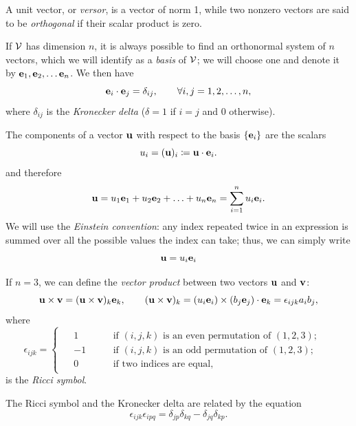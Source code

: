 A unit vector, or \textit{versor}, is a vector of norm 1, while two nonzero vectors are said to be \textit{orthogonal} if their scalar product is zero.

If $\mathcal{V}$ has dimension $n$, it is always possible to find an orthonormal system of $n$ vectors, which we will identify as a \textit{basis} of $\mathcal{V}$; we will choose one and denote it by $\mathbf{e}_1, \mathbf{e}_2, \ldots \mathbf{e}_n$. We then have
\begin{equation}
	\mathbf{e}_i \cdot \mathbf{e}_j=\delta_{ij}, \qquad \forall i,j=1,2,\ldots, n,
\end{equation}
where $\delta_{ij}$ is the \textit{Kronecker delta} ($\delta=1$ if $i=j$ and 0 otherwise).

The components of a vector $\mathbf{u}$ with respect to the basis $\{\mathbf{e}_i\}$ are the scalars
\begin{equation}
	u_i=(\mathbf{u})_i\coloneqq \mathbf{u} \cdot \mathbf{e}_i.
\end{equation}
and therefore
\begin{equation}
	\mathbf{u} =u_1 \mathbf{e}_1+ u_2\mathbf{e}_2+\ldots+u_n \mathbf{e}_n=\sum_{i=1}^n u_i \mathbf{e}_i.
\end{equation}
We will use the \textit{Einstein convention}: any index repeated twice in an expression is summed over all the possible values the index can take; thus, we can simply write
\begin{equation}
	\mathbf{u}=u_i \mathbf{e}_i
\end{equation}

If $n=3$, we can define the \textit{vector product} between two vectors $\mathbf{u}$ and $\mathbf{v}$:
\begin{equation}
	\mathbf{u} \times \mathbf{v} =(\mathbf{u} \times \mathbf{v})_k \mathbf{e}_k, \qquad (\mathbf{u} \times \mathbf{v})_k=(u_i \mathbf{e}_i)\times (b_j\mathbf{e}_j)\cdot \mathbf{e}_k=\epsilon_{ijk}a_i b_j,
\end{equation}
where 
\begin{equation}\label{Ricci}
	\epsilon_{ijk}=
	\begin{cases}
		\begin{aligned}
			&1 \qquad &&\text{if }(i,j,k)\text{ is an even permutation of }(1,2,3);\\
			&-1  &&\text{if }(i,j,k)\text{ is an odd permutation of }(1,2,3);\\
			&0 &&\text{if two indices are equal,}&
		\end{aligned}
	\end{cases}
\end{equation}
is the \textit{Ricci symbol}.

The Ricci symbol and the Kronecker delta are related by the equation
\begin{equation}\label{epsdel}
	\epsilon_{ijk}\epsilon_{ipq}=\delta_{jp}\delta_{kq}-\delta_{jq}\delta_{kp}.
\end{equation}

